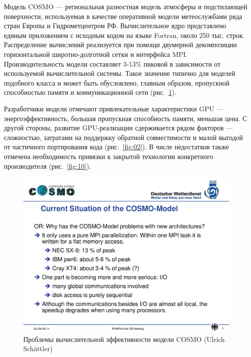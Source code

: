 \documentclass[a4,12pt]{report}
\begin{document}
Модель COSMO --- региональная разностная модель атмосферы и подстилающей поверхности, используемая в качестве оперативной модели метеослужбами ряда стран Европы и Гидрометцентром РФ. Вычислительное ядро представлено единым приложением с исходным кодом на языке Fortran, около 250 тыс. строк. Распределение вычислений реализуется при помощи двумерной декомпозиции горизонтальной широтно-долготной сетки и интерфейса MPI. Производительность модели составляет 3-13\% пиковой в зависимости от используемой вычислительной системы. Такое значение типично для моделей подобного класса и может быть обусловлено, главным образом, пропускной способностью памяти и коммуникационной сети (рис.~\ref{fig:01}).

Разработчики модели отмечают привлекательные характеристики GPU --- энергоэффективность, большая пропускная способность памяти, меньшая цена. С другой стороны, развитие GPU-реализации сдерживается рядом факторов --- сложностью, затратами на поддержку обратной совместимости и малой выгодой от частичного портирования кода (рис.~\ref{fig:02}). В числе недостатков также отмечена необходимость привязки к закрытой технологии конкретного производителя (рис.~\ref{fig:10}).

\begin{figure}
\centering
\includegraphics[scale=0.4]{slides/01.pdf}
\caption{Проблемы вычислительной эффективности модели COSMO (Ulrich Schättler)}
\label{fig:01}
\end{figure}
\end{document}

